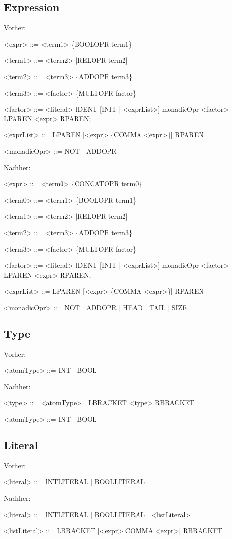 \documentclass[a4paper,notitlepage,oneside]{scrartcl}
\begin{document}
\subsection{Expression}
Vorher: 
\begin{grammar}
<expr> ::= <term1> \{BOOLOPR term1\}

<term1> ::= <term2> [RELOPR term2]

<term2> ::= <term3> \{ADDOPR term3\}

<term3> ::= <factor> \{MULTOPR factor\}

<factor> ::= <literal>
		\alt IDENT [INIT | <exprList>]
		\alt monadicOpr <factor>
		\alt LPAREN <expr> RPAREN;
		
<exprList> ::= LPAREN [<expr> \{COMMA <expr>\}] RPAREN

<monadicOpr> ::= NOT | ADDOPR
\end{grammar}
Nachher:
\begin{grammar}
<expr> ::= <term0> \{CONCATOPR term0\}

<term0> ::= <term1> \{BOOLOPR term1\}

<term1> ::= <term2> [RELOPR term2]

<term2> ::= <term3> \{ADDOPR term3\}

<term3> ::= <factor> \{MULTOPR factor\}

<factor> ::= <literal>
		\alt IDENT [INIT | <exprList>]
		\alt monadicOpr <factor>
		\alt LPAREN <expr> RPAREN;
		
<exprList> ::= LPAREN [<expr> \{COMMA <expr>\}] RPAREN

<monadicOpr> ::= NOT | ADDOPR | HEAD | TAIL | SIZE

\end{grammar}

\newpage


\subsection{Type}
Vorher:
\begin{grammar}
<atomType> ::= INT | BOOL
\end{grammar}
Nachher:
\begin{grammar}
<type> ::=  <atomType> | LBRACKET <type> RBRACKET

<atomType> ::= INT | BOOL
\end{grammar}

\subsection{Literal}
Vorher:
\begin{grammar}
<literal> ::= INTLITERAL | BOOLLITERAL
\end{grammar}
Nachher:
\begin{grammar}
<literal> ::= INTLITERAL | BOOLLITERAL | <listLiteral>

<listLiteral> ::= LBRACKET [<expr> {COMMA <expr>}] RBRACKET
\end{grammar}
\end{document}
